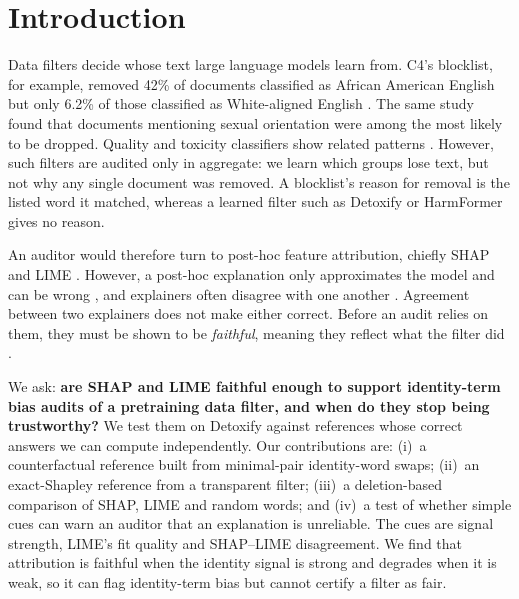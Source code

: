 \section{Introduction}\label{sec:intro}
 
Data filters decide whose text large language models learn from. C4's blocklist, for example, removed 42\% of documents classified as African American English but only 6.2\% of those classified as White-aligned English \cite{dodge2021documenting}. The same study found that documents mentioning sexual orientation were among the most likely to be dropped. Quality and toxicity classifiers show related patterns \cite{gururangan2022whose,sap2019risk}. However, such filters are audited only in aggregate: we learn which groups lose text, but not why any single document was removed. A blocklist's reason for removal is the listed word it matched, whereas a learned filter such as Detoxify \cite{detoxify} or HarmFormer \cite{mendu2025safer} gives no reason.
 
An auditor would therefore turn to post-hoc feature attribution, chiefly SHAP \cite{lundberg2017unified} and LIME \cite{ribeiro2016why}. However, a post-hoc explanation only approximates the model and can be wrong \cite{rudin2019stop}, and explainers often disagree with one another \cite{krishna2022disagreement}. Agreement between two explainers does not make either correct. Before an audit relies on them, they must be shown to be \emph{faithful}, meaning they reflect what the filter did \cite{jacovi2020faithfully}.
 
We ask: \textbf{are SHAP and LIME faithful enough to support identity-term bias audits of a pretraining data filter, and when do they stop being trustworthy?} We test them on Detoxify against references whose correct answers we can compute independently. Our contributions are: (i)~a counterfactual reference built from minimal-pair identity-word swaps; (ii)~an exact-Shapley reference from a transparent filter; (iii)~a deletion-based comparison of SHAP, LIME and random words; and (iv)~a test of whether simple cues can warn an auditor that an explanation is unreliable. The cues are signal strength, LIME's fit quality and SHAP--LIME disagreement. We find that attribution is faithful when the identity signal is strong and degrades when it is weak, so it can flag identity-term bias but cannot certify a filter as fair.
